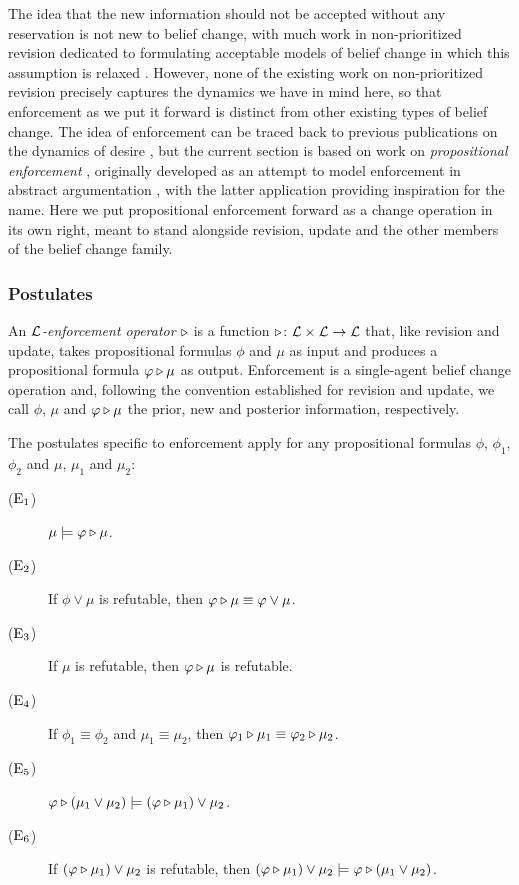 The idea that the new information should not be 
accepted without any reservation is not new to 
belief change, with much work in non-prioritized 
revision dedicated to formulating acceptable models 
of belief change in which this assumption is 
relaxed \cite{Hansson99b,HanssonFCF01}.
However, none of the existing work on non-prioritized revision
precisely captures the dynamics we have in mind here,
so that enforcement as we put it forward is distinct 
from other existing types of belief change.
The idea of enforcement can be traced back to previous 
publications on the dynamics of desire \cite{DuboisLP17},
but the current section is based on work on
\emph{propositional enforcement} \cite{HaretWW18},
originally developed as an attempt to model 
enforcement in abstract argumentation
\cite{Baumann12,WallnerNJ17}, 
with the latter application providing inspiration for the name.
Here we put propositional enforcement forward 
as a change operation in its own right,
meant to stand alongside revision, update 
and the other members of the belief change family. 


\subsubsection{Postulates}
An \emph{$\mathcal{L}$-enforcement operator $\triangleright$} is a function
$\triangleright\colon\mathcal{L}\times\mathcal{L}\rightarrow\mathcal{L}$ that, 
like revision and update, takes propositional formulas 
$\phi$ and $\mu$ as input
and produces a propositional formula $\varphi\triangleright\mu$ as output.
Enforcement is a single-agent belief change operation
and, following the convention established for revision and update,
we call $\phi$, $\mu$ and $\varphi\triangleright\mu$ the prior, new and posterior information, 
respectively.

The postulates specific to enforcement apply 
for any propositional formulas $\phi$, $\phi_{1}$, $\phi_{2}$
and $\mu$, $\mu_{1}$ and $\mu_{2}$:

\begin{description}
	\item[($\mathrm{E}_{1}$)] $\mu\models\varphi\triangleright\mu$.
	\item[($\mathrm{E}_{2}$)] If $\phi\lor\mu$ is refutable, then $\varphi\triangleright\mu\equiv\varphi\lor\mu$.
	\item[($\mathrm{E}_{3}$)] If $\mu$ is refutable, then $\varphi\triangleright\mu$ is refutable.
	\item[($\mathrm{E}_{4}$)] If $\phi_1\equiv\phi_2$ and $\mu_1\equiv\mu_2$, then $\varphi_1\triangleright\mu_1\equiv\varphi_2\triangleright\mu_2$.
	\item[($\mathrm{E}_{5}$)] $\varphi\triangleright(\mu_1\lor\mu_2)\models(\varphi\triangleright\mu_1)\lor\mu_2$.
	\item[($\mathrm{E}_{6}$)] If $(\varphi\triangleright\mu_1)\lor\mu_2$ is refutable, then $(\varphi\triangleright\mu_1)\lor\mu_2\models\varphi\triangleright(\mu_1\lor\mu_2)$.
\end{description}

